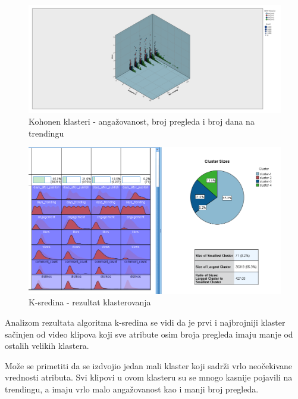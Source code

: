 \documentclass[a4paper]{article}
\theoremstyle{definition}
\begin{document}
\begin{figure}[H]
\begin{center}
    \includegraphics[width=1\textwidth]{Kohonen_engagement_views_days_trending.png}
    \caption{Kohonen klasteri - angažovanost, broj pregleda i broj dana na trendingu}
     \label{fig:ko3}
\end{center}
\end{figure}



\begin{figure}[H]
\begin{center}
    \includegraphics[width=1\textwidth]{Kmeans.png}
    \caption{K-sredina - rezultat klasterovanja}
     \label{fig:km1}
\end{center}
\end{figure}



Analizom rezultata algoritma k-sredina se vidi da je prvi i najbrojniji klaster sačinjen od video klipova koji sve atribute osim broja pregleda imaju manje od ostalih velikih klastera.

Može se primetiti da se izdvojio jedan mali klaster koji sadrži vrlo neočekivane vrednosti atributa. Svi klipovi u ovom klasteru su se mnogo kasnije pojavili na trendingu,
a imaju vrlo malo angažovanost kao i manji broj pregleda.
\end{document}
